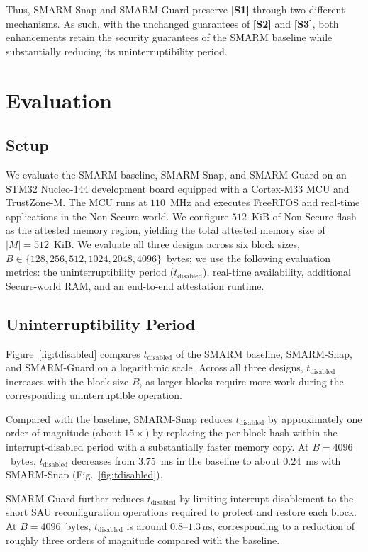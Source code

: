 \documentclass[conference]{IEEEtran}
\newcommand{\tdis}{$t_{\mathrm{disabled}}$\xspace}
\newcommand{\smarmcopy}{SMARM-Snap\xspace}
\newcommand{\smarmlock}{SMARM-Guard\xspace}
\begin{document}
Thus, \smarmcopy and \smarmlock preserve \textbf{[S1]} through two different mechanisms.
As such, with the unchanged guarantees of \textbf{[S2]} and \textbf{[S3]}, both enhancements retain the security guarantees of the SMARM baseline while substantially reducing its uninterruptibility period.



\section{Evaluation}
\label{sec:eval}

\subsection{Setup}

We evaluate the SMARM baseline, \smarmcopy, and \smarmlock on an STM32 Nucleo-144 development board equipped with a Cortex-M33 MCU and TrustZone-M. The MCU runs at $110$~MHz and executes FreeRTOS and real-time applications in the Non-Secure world. 
We configure $512$~KiB of Non-Secure flash as the attested memory region, yielding the total attested memory size of $|M|{=}512$~KiB.
We evaluate all three designs across six block sizes,
$B\in\{128,256,512,1024,2048,4096\}$~bytes; we use the following evaluation metrics: the uninterruptibility period (\tdis), real-time availability, additional Secure-world RAM, and an end-to-end attestation runtime.

\subsection{Uninterruptibility Period}

Figure~\ref{fig:tdisabled} compares \tdis{} of the SMARM baseline, \smarmcopy, and \smarmlock{} on a logarithmic scale. Across all three designs, \tdis{} increases with the block size $B$, as larger blocks require more work during the corresponding uninterruptible operation.

Compared with the baseline, \smarmcopy{} reduces \tdis{} by approximately one order of magnitude (about $15\times$) by replacing the per-block hash within the interrupt-disabled period with a substantially faster memory copy. At $B{=}4096$~bytes, \tdis{} decreases from $3.75$~ms in the baseline to about $0.24$~ms with \smarmcopy{} (Fig.~\ref{fig:tdisabled}).


\smarmlock{} further reduces \tdis{} by limiting interrupt disablement to the short SAU reconfiguration operations required to protect and restore each block. At $B{=}4096$~bytes, \tdis{} is around $0.8$--$1.3\,\mu$s, corresponding to a reduction of roughly three orders of magnitude compared with the baseline.
\end{document}
